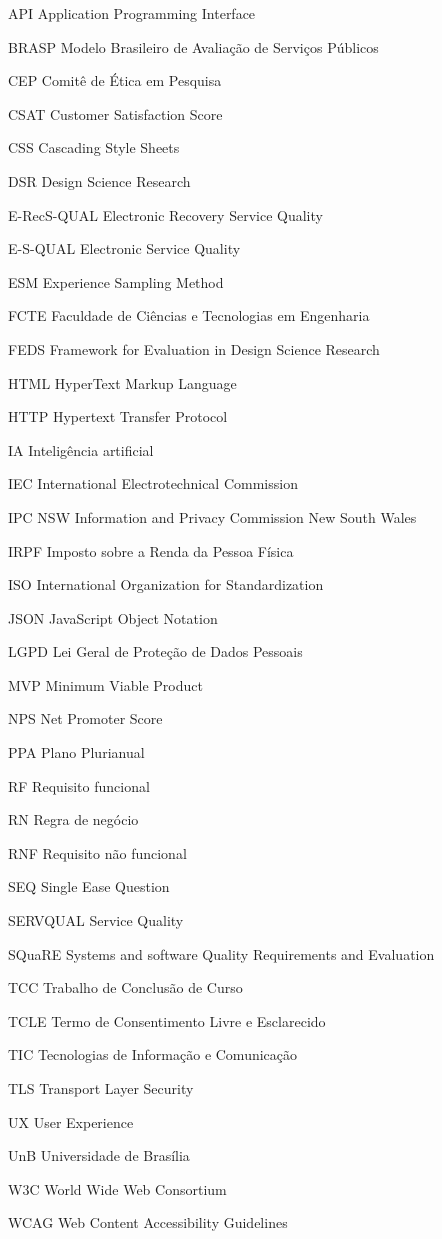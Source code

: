 \begin{siglas}
\item[API] Application Programming Interface
\item[BRASP] Modelo Brasileiro de Avaliação de Serviços Públicos
\item[CEP] Comitê de Ética em Pesquisa
\item[CSAT] Customer Satisfaction Score
\item[CSS] Cascading Style Sheets
\item[DSR] Design Science Research
\item[E-RecS-QUAL] Electronic Recovery Service Quality
\item[E-S-QUAL] Electronic Service Quality
\item[ESM] Experience Sampling Method
\item[FCTE] Faculdade de Ciências e Tecnologias em Engenharia
\item[FEDS] Framework for Evaluation in Design Science Research
\item[HTML] HyperText Markup Language
\item[HTTP] Hypertext Transfer Protocol
\item[IA] Inteligência artificial
\item[IEC] International Electrotechnical Commission
\item[IPC NSW] Information and Privacy Commission New South Wales
\item[IRPF] Imposto sobre a Renda da Pessoa Física
\item[ISO] International Organization for Standardization
\item[JSON] JavaScript Object Notation
\item[LGPD] Lei Geral de Proteção de Dados Pessoais
\item[MVP] Minimum Viable Product
\item[NPS] Net Promoter Score
\item[PPA] Plano Plurianual
\item[RF] Requisito funcional
\item[RN] Regra de negócio
\item[RNF] Requisito não funcional
\item[SEQ] Single Ease Question
\item[SERVQUAL] Service Quality
\item[SQuaRE] Systems and software Quality Requirements and Evaluation
\item[TCC] Trabalho de Conclusão de Curso
\item[TCLE] Termo de Consentimento Livre e Esclarecido
\item[TIC] Tecnologias de Informação e Comunicação
\item[TLS] Transport Layer Security
\item[UX] User Experience
\item[UnB] Universidade de Brasília
\item[W3C] World Wide Web Consortium
\item[WCAG] Web Content Accessibility Guidelines
\end{siglas}
